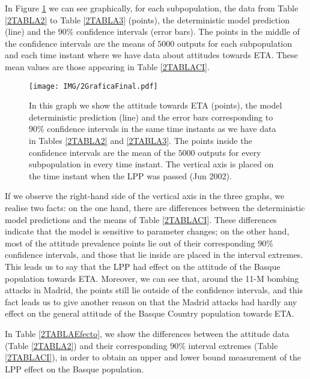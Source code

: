 In Figure \ref{2gCI} we can see graphically, for each subpopulation, the data from Table \ref{2TABLA2} to Table \ref{2TABLA3} (points), the deterministic model prediction (line) and the $90\%$ confidence intervals (error bars). The points in the middle of the confidence intervals are the means of $5000$ outputs for each subpopulation and each time instant where we have data about attitudes towards ETA. These mean values are those appearing in Table \ref{2TABLACI}. 

\begin{figure}[h]
 \begin{center}
  \texttt{[image: IMG/2GraficaFinal.pdf]}\\
  \caption{In this graph we show the attitude towards ETA (points), the model deterministic prediction (line) and the error bars corresponding to $90\%$ confidence intervals in the same time instants as we have data in Tables \ref{2TABLA2} and \ref{2TABLA3}. The points inside the confidence intervals are the mean of the $5000$ outputs for every subpopulation in every time instant. The vertical axis is placed on the time instant when the LPP was passed (Jun 2002).} \label{2gCI}
\end{center}
\end{figure} 

If we observe the right-hand side of the vertical axis in the three graphs, we realise two facts: on the one hand, there are differences between the deterministic model predictions and the means of Table \ref{2TABLACI}. These differences indicate that the model is sensitive to parameter changes; on the other hand, most of the attitude prevalence points lie out of their corresponding $90\%$ confidence intervals, and those that lie inside are placed in the interval extremes. This leads us to say that the LPP had effect on the attitude of the Basque population towards ETA. Moreover, we can see that, around the 11-M bombing attacks in Madrid, the points still lie outside of the confidence intervals, and this fact leads us to give another reason on that the Madrid attacks had hardly any effect on the general attitude of the Basque Country population towards ETA.   

In Table \ref{2TABLAEfecto}, we show the differences between the attitude data (Table \ref{2TABLA2}) and their corresponding $90\%$ interval extremes (Table \ref{2TABLACI}), in order to obtain an upper and lower bound measurement of the LPP effect on the Basque population.

